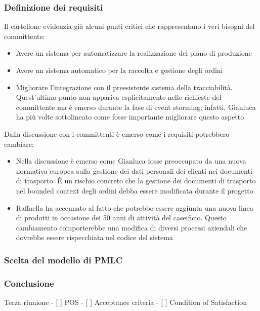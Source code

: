 \subsubsection{Definizione dei requisiti}
Il cartellone evidenzia già alcuni punti critici che rappresentano i veri bisogni del committente:
\begin{itemize}
  \item Avere un sistema per automatizzare la realizzazione del piano di produzione
  \item Avere un sistema automatico per la raccolta e gestione degli ordini
  \item Migliorare l'integrazione con il preesistente sistema della tracciabilità. Quest'ultimo punto non appariva esplicitamente nelle richieste del committente ma è emerso durante la fase di event storming; infatti, Gianluca ha più volte sottolineato come fosse importante migliorare questo aspetto
\end{itemize}

Dalla discussione con i committenti è emerso come i requisiti potrebbero cambiare:
\begin{itemize}
  \item Nella discussione è emerso come Gianluca fosse preoccupato da una nuova normativa europea sulla gestione dei dati personali dei clienti nei documenti di trasporto. È un rischio concreto che la gestione dei documenti di trasporto nel bounded context degli ordini debba essere modificata durante il progetto
  \item Raffaella ha accennato al fatto che potrebbe essere aggiunta una nuova linea di prodotti in occasione dei 50 anni di attività del caseificio. Questo cambiamento comporterebbe una modifica di diversi processi aziendali che dovrebbe essere rispecchiata nel codice del sistema
\end{itemize}

\subsubsection{Scelta del modello di PMLC}
\label{sec:seconda-riunione-pmlc}



\subsubsection{Conclusione}
\label{sec:seconda-riunione-conclusione}


Terza riunione
- [ ] POS
  - [ ] Acceptance criteria
  - [ ] Condition of Satisfaction 